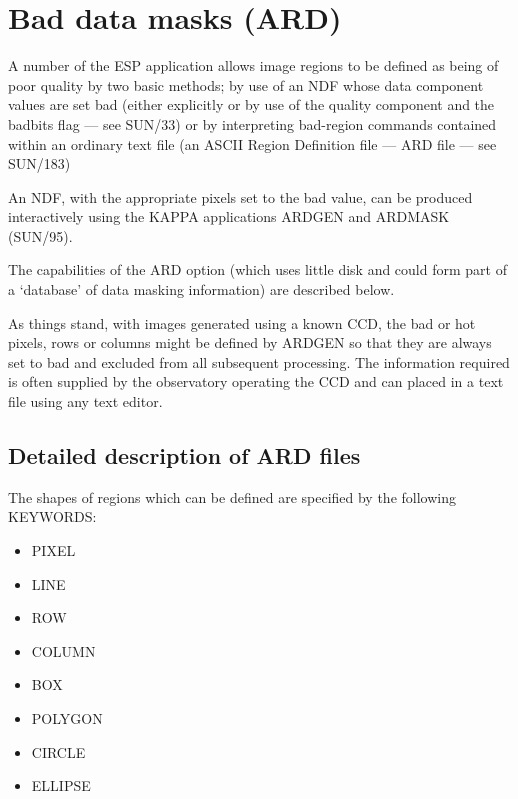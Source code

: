 \documentclass[twoside,11pt]{article}
\newcommand{\xref}[3]{#1}
\begin{document}
\newpage

\section{Bad data masks (ARD)}
\label{app:bad}

A number of the ESP application allows image regions to be defined as being of
poor quality by two basic methods; by use of an NDF whose data component
values are set bad (either explicitly or by use of the quality component
and the badbits flag --- see \xref{SUN/33}{sun33}{}) or by interpreting bad-region
commands contained within an ordinary text file (an ASCII Region Definition file
--- ARD file --- see \xref{SUN/183}{sun183}{})

An NDF, with the appropriate pixels set to the bad value, can be produced
interactively using the \xref{KAPPA}{sun95}{} applications ARDGEN and ARDMASK
(\xref{SUN/95}{sun95}{}).

The capabilities of the ARD option (which uses little disk
and could form part of a `database' of data masking information)
are described below.

As things stand, with images generated using a known CCD, the bad or hot
pixels, rows or columns might be
defined by ARDGEN so that they are always set to bad and excluded from all
subsequent processing. The information required is often supplied by the
observatory operating the CCD and can placed in a text file using
any text editor.

\subsection{Detailed description of ARD files}

The shapes of regions which can be defined are specified by the
following KEYWORDS:
\begin{itemize}
\item PIXEL
\item LINE
\item ROW
\item COLUMN
\item BOX
\item POLYGON
\item CIRCLE
\item ELLIPSE
\end{itemize}
\end{document}
